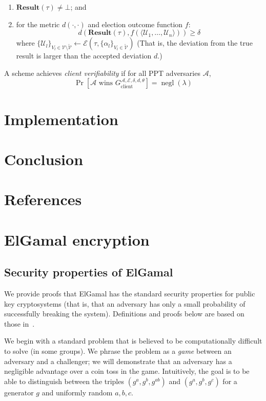 \documentclass[12pt,a4paper]{article}
\DeclareMathOperator{\negl}{\text{negl}}
\theoremstyle{definition}
\begin{document}
\begin{definition}
\begin{enumerate}
        \item $\mathbf{Result}(\tau) \neq \bot$; and
        \item for the metric $d(\cdot, \cdot)$ and election outcome function $f$:
                    $$d(\mathbf{Result}(\tau), f(\langle\mathcal{U}_1,\ldots,\mathcal{U}_n\rangle)) \geq \delta$$
            where $\{\mathcal{U}_l\}_{V_l \in \mathcal{V} \setminus \tilde{\mathcal{V}}} \leftarrow \mathcal{E}(\tau, \{\alpha_l \}_{V_l \in \tilde{\mathcal{V}}})$
            (That is, the deviation from the true result is larger than the accepted deviation $d$.)
    \end{enumerate}
    A scheme achieves \textit{client verifiability} if for all PPT adversaries $\mathcal{A}$, $$\Pr\left[\mathcal{A}\text{ wins }G_\text{client}^{\mathcal{A},\mathcal{E},\delta,d,\theta}\right]=\negl(\lambda)$$
\end{definition}

\section{Implementation}\label{sec-impl}
\section{Conclusion}
\newpage
\section{References}


\newpage
\appendix
\section{ElGamal encryption}\label{app-elgamal}
\subsection{Security properties of ElGamal}
We provide proofs that ElGamal has the standard security properties for public key cryptosystems (that is, that an adversary has only a small probability of successfully breaking the system). Definitions and proofs below are based on those in~\cite{katz2014introduction}.

We begin with a standard problem that is believed to be computationally difficult to solve (in some groups). We phrase the problem as a \textit{game} between an adversary and a challenger; we will demonstrate that an adversary has a negligible advantage over a coin toss in the game. Intuitively, the goal is to be able to distinguish between the triples $(g^a, g^b, g^{ab})$ and $(g^a, g^b, g^c)$ for  a generator $g$ and uniformly random $a, b, c$.
\end{document}
